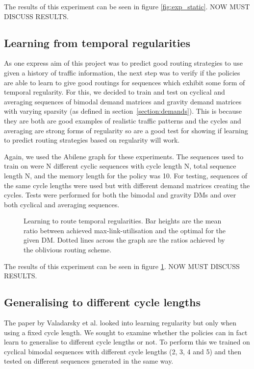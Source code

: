 The results of this experiment can be seen in figure \ref{fig:exp_static}. NOW MUST DISCUSS RESULTS.


\subsection{Learning from temporal regularities}
As one express aim of this project was to predict good routing strategies to use given a history of traffic information, the next step was to verify if the policies are able to learn to give good routings for sequences which exhibit some form of temporal regularity. For this, we decided to train and test on cyclical and averaging sequences of bimodal demand matrices and gravity demand matrices with varying sparsity (as defined in section~\ref{section:demands}). This is because they are both are good examples of realistic traffic patterns and the cycles and averaging are strong forms of regularity so are a good test for showing if learning to predict routing strategies based on regularity will work.

Again, we used the Abilene graph for these experiments. The sequences used to train on were N different cyclic sequences with cycle length N, total sequence length N, and the memory length for the policy was 10. For testing, sequences of the same cycle lengths were used but with different demand matrices creating the cycles. Tests were performed for both the bimodal and gravity DMs and over both cyclical and averaging sequences.

\begin{figure}
    \centering
    
    \caption{Learning to route temporal regularities. Bar heights are the mean ratio between achieved max-link-utilisation and the optimal for the given DM. Dotted lines across the graph are the ratios achieved by the oblivious routing scheme.}
    \label{fig:exp_cyclic}
\end{figure}

The results of this experiment can be seen in figure \ref{fig:exp_cyclic}. NOW MUST DISCUSS RESULTS.

\subsection{Generalising to different cycle lengths}
The paper by Valadarsky et al. looked into learning regularity but only when using a fixed cycle length. We sought to examine whether the policies can in fact learn to generalise to different cycle lengths or not. To perform this we trained on cyclical bimodal sequences with different cycle lengths (2, 3, 4 and 5) and then tested on different sequences generated in the same way.

